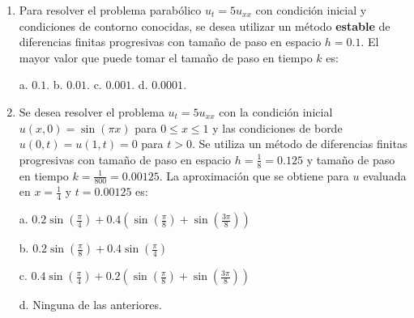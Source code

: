 \documentclass[11pt]{article}
\begin{document}
\begin{enumerate}
\vspace{4pt}
\noindent a. $u(0)=0,\ u'(0)=0$ \hspace{1cm} b. $u(0)=1,\ u'(0)=0$

\noindent c. $u(0)=e^{-10},\ u'(0)=1$ \hspace{1cm} d. Ninguna de las anteriores

\item{} Para resolver el problema parabólico $u_t=5u_{xx}$ con condición inicial y condiciones de contorno conocidas, se desea utilizar un método \textbf{estable} de diferencias finitas progresivas con tamaño de paso en espacio $h=0.1$. El mayor valor que puede tomar el tamaño de paso en tiempo $k$ es:

\vspace{4pt}
\noindent a. $0.1$. \hspace{1cm} b. $0.01$. \hspace{1cm} c. $0.001$. \hspace{1cm} d. $0.0001$.

\item{} Se desea resolver el problema $u_t=5u_{xx}$ con la condición inicial $u(x,0)=\sin(\pi x)$ para $0\leq x\leq 1$ y las condiciones de borde $u(0,t)=u(1,t)=0$ para $t>0$. Se utiliza un método de diferencias finitas progresivas con tamaño de paso en espacio $h=\frac{1}{8}=0.125$ y tamaño de paso en tiempo $k=\frac{1}{800}=0.00125$. La aproximación que se obtiene para $u$ evaluada en $x=\frac{1}{4}$ y $t=0.00125$ es:

\vspace{4pt}
\noindent
\begin{minipage}[t]{0.48\linewidth}
a. $0.2\sin\left(\frac{\pi}{4}\right)+0.4\left(\sin\left(\frac{\pi}{8}\right)+\sin\left(\frac{3\pi}{8}\right)\right)$
\end{minipage}%
\begin{minipage}[t]{0.48\linewidth}
b. $0.2\sin\left(\frac{\pi}{8}\right)+0.4\sin\left(\frac{\pi}{4}\right)$
\end{minipage}

\vspace{6pt}
\noindent
\begin{minipage}[t]{0.48\linewidth}
c. $0.4\sin\left(\frac{\pi}{4}\right)+0.2\left(\sin\left(\frac{\pi}{8}\right)+\sin\left(\frac{3\pi}{8}\right)\right)$
\end{minipage}%
\begin{minipage}[t]{0.48\linewidth}
d. Ninguna de las anteriores.
\end{minipage}
\end{enumerate}
\end{document}
